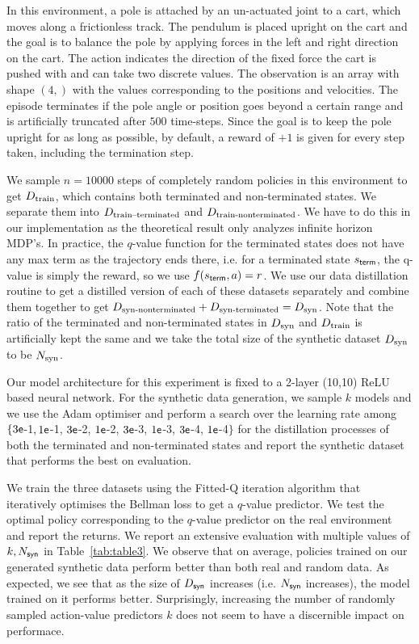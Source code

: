 In this environment, a pole is attached by an un-actuated joint to a cart, which moves along a frictionless track. The pendulum is placed upright on the cart and the goal is to balance the pole by applying forces in the left and right direction on the cart.
The action indicates the direction of the fixed force the cart is pushed with and can take two discrete values.
The observation is an array with shape $(4,)$ with the values corresponding to the positions and velocities. The episode terminates if the pole angle or position goes beyond a certain range and is artificially truncated after $500$ time-steps.
Since the goal is to keep the pole upright for as long as possible, by default, a reward of $+1$ is given for every step taken, including the termination step.

We sample $n=10000$ steps of completely random policies in this environment to get $D_{\textnormal{train}}$, which contains both terminated and non-terminated states. We separate them into $D_{\textnormal{train--terminated}}$ and $D_{\textnormal{train-nonterminated}}$. We have to do this in our implementation as the theoretical result only analyzes infinite horizon MDP's. In practice, the $q$-value function for the terminated states does not have any max term as the trajectory ends there, i.e. for a terminated state $s_{\sf term}$, the q-value is simply the reward, so we use $f(s_{\sf term},a) = r$. We use our data distillation routine to get a distilled version of each of these datasets separately and combine them together to get $D_{\textnormal{syn-nonterminated}}+D_{\textnormal{syn-terminated}}= D_{\textnormal{syn}}$. Note that the ratio of the terminated and non-terminated states in $D_{\textnormal{syn}}$ and $D_{\textnormal{train}}$ is artificially kept the same and we take the total size of the synthetic dataset $D_{\textnormal{syn}}$ to be $N_{\textnormal{syn}}$.

Our model architecture for this experiment is fixed to a 2-layer (10,10) ReLU based neural network. For the synthetic data generation, we sample $k$ models and we use the {\sf Adam} optimiser and perform a search over the learning rate among $\{ 3{\sf e}$-1$, 1{\sf e}$-1, $3{\sf e}$-2, $1{\sf e}$-2, $3{\sf e}$-3, $1{\sf e}$-3, $3{\sf e}$-4, $1{\sf e}$-4$\}$ for the distillation processes of both the terminated and non-terminated states and report the synthetic dataset that performs the best on evaluation.

We train the three datasets using the Fitted-Q iteration algorithm that iteratively optimises the Bellman loss to get a $q$-value predictor. We test the optimal policy corresponding to the $q$-value predictor on the real environment and report the returns. We report an extensive evaluation with multiple values of $k, N_{\sf syn}$ in Table~\ref{tab:table3}. We observe that on average, policies trained on our generated synthetic data perform better than both real and random data. As expected, we see that as the size of $D_{\sf syn}$ increases (i.e. $N_{\sf syn}$ increases), the model trained on it performs better. Surprisingly, increasing the number of randomly sampled action-value predictors $k$ does not seem to have a discernible impact on performace. 

